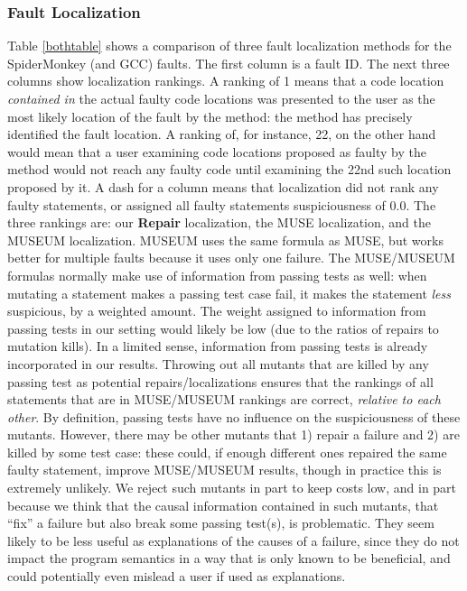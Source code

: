 \subsubsection{Fault Localization}

Table \ref{bothtable} shows a comparison of three fault localization methods for the SpiderMonkey (and GCC) faults.  The first column is a fault ID. The next three columns show localization rankings.  A ranking of 1 means that a code location \emph{contained in} the actual faulty code locations was presented to the user as the most likely location of the fault by the method: the method has precisely identified the fault location.  A ranking of, for instance, 22, on the other hand would mean that a user examining code locations proposed as faulty by the method would not reach any faulty code until examining the 22nd such location proposed by it.  A dash for a column means that localization did not rank any faulty statements, or assigned all faulty statements suspiciousness of 0.0.  The three rankings are: our {\bf Repair} localization, the MUSE \cite{MUSE} localization, and the MUSEUM \cite{multilingual} localization.  MUSEUM uses the same formula as MUSE, but works better for multiple faults because it uses only one failure.  The MUSE/MUSEUM formulas normally make use of information from passing tests as well: when mutating a statement makes a passing test case fail, it makes the statement \emph{less} suspicious, by a weighted amount. The weight assigned to information from passing tests in our setting would likely be low (due to the ratios of repairs to mutation kills).  In a limited sense, information from passing tests is already incorporated in our results.  Throwing out all mutants that are killed by any passing test as potential repairs/localizations ensures that the rankings of all statements that are in MUSE/MUSEUM rankings are correct, \emph{relative to each other}.  By definition, passing tests have no influence on the suspiciousness of these mutants.  However, there may be other mutants that 1) repair a failure and 2) are killed by some test case: these could, if enough different ones repaired the same faulty statement, improve MUSE/MUSEUM results, though in practice this is extremely unlikely.  We reject such mutants in part to keep costs low, and in part because we think that the causal information contained in such mutants, that ``fix'' a failure but also break some passing test(s), is problematic.  They seem likely to be less useful as explanations of the causes of a failure, since they do not impact the program semantics in a way that is only known to be beneficial, and could potentially even mislead a user if used as explanations.

